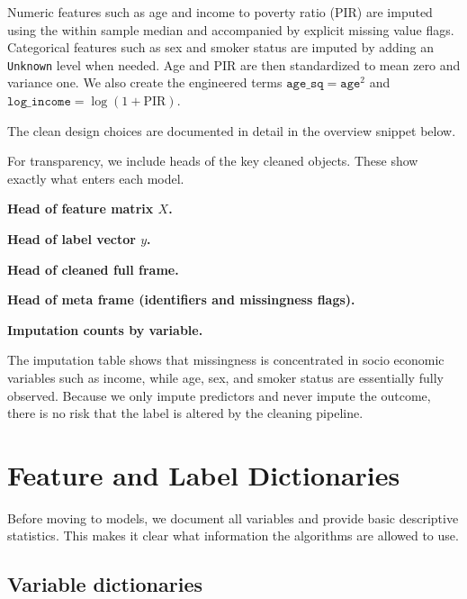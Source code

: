 \documentclass{article}
\begin{document}
Numeric features such as age and income to poverty ratio (PIR) are imputed using the within sample median and accompanied by explicit missing value flags. Categorical features such as sex and smoker status are imputed by adding an \texttt{Unknown} level when needed. Age and PIR are then standardized to mean zero and variance one. We also create the engineered terms
\(\texttt{age\_sq} = \texttt{age}^2\) and \(\texttt{log\_income} = \log(1 + \text{PIR})\).

The clean design choices are documented in detail in the overview snippet below.



For transparency, we include heads of the key cleaned objects. These show exactly what enters each model.

\medskip
\noindent\textbf{Head of feature matrix \(X\).}
\par


\medskip
\noindent\textbf{Head of label vector \(y\).}
\par


\medskip
\noindent\textbf{Head of cleaned full frame.}
\par


\medskip
\noindent\textbf{Head of meta frame (identifiers and missingness flags).}
\par


\medskip
\noindent\textbf{Imputation counts by variable.}
\par


The imputation table shows that missingness is concentrated in socio economic variables such as income, while age, sex, and smoker status are essentially fully observed. Because we only impute predictors and never impute the outcome, there is no risk that the label is altered by the cleaning pipeline.

\section{Feature and Label Dictionaries}

Before moving to models, we document all variables and provide basic descriptive statistics. This makes it clear what information the algorithms are allowed to use.

\subsection*{Variable dictionaries}
\end{document}
